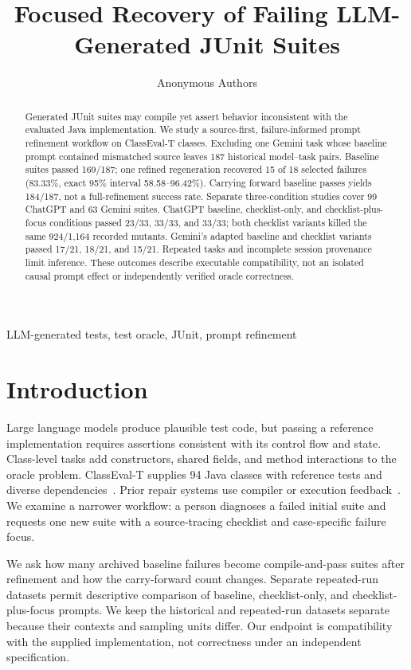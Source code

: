 \documentclass[conference]{IEEEtran}
\begin{document}
\title{Focused Recovery of Failing LLM-Generated JUnit Suites}
\author{Anonymous Authors}
\maketitle

\begin{abstract}
Generated JUnit suites may compile yet assert behavior inconsistent with the evaluated Java implementation. We study a source-first, failure-informed prompt refinement workflow on ClassEval-T classes. Excluding one Gemini task whose baseline prompt contained mismatched source leaves 187 historical model--task pairs. Baseline suites passed 169/187; one refined regeneration recovered 15 of 18 selected failures (83.33\%, exact 95\% interval 58.58--96.42\%). Carrying forward baseline passes yields 184/187, not a full-refinement success rate. Separate three-condition studies cover 99 ChatGPT and 63 Gemini suites. ChatGPT baseline, checklist-only, and checklist-plus-focus conditions passed 23/33, 33/33, and 33/33; both checklist variants killed the same 924/1,164 recorded mutants. Gemini's adapted baseline and checklist variants passed 17/21, 18/21, and 15/21. Repeated tasks and incomplete session provenance limit inference. These outcomes describe executable compatibility, not an isolated causal prompt effect or independently verified oracle correctness.
\end{abstract}
\begin{IEEEkeywords}
LLM-generated tests, test oracle, JUnit, prompt refinement
\end{IEEEkeywords}

\section{Introduction}
Large language models produce plausible test code, but passing a reference implementation requires assertions consistent with its control flow and state. Class-level tasks add constructors, shared fields, and method interactions to the oracle problem. ClassEval-T supplies 94 Java classes with reference tests and diverse dependencies~\cite{classevalt}. Prior repair systems use compiler or execution feedback~\cite{chattester,testart}. We examine a narrower workflow: a person diagnoses a failed initial suite and requests one new suite with a source-tracing checklist and case-specific failure focus.

We ask how many archived baseline failures become compile-and-pass suites after refinement and how the carry-forward count changes. Separate repeated-run datasets permit descriptive comparison of baseline, checklist-only, and checklist-plus-focus prompts. We keep the historical and repeated-run datasets separate because their contexts and sampling units differ. Our endpoint is compatibility with the supplied implementation, not correctness under an independent specification.
\end{document}

